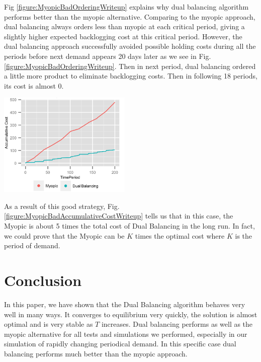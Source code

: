 \documentclass[twoside]{article}
\begin{document}
\begin{multicols}{2}
\begin{center}
  \end{center}
  Fig \ref{figure:MyopicBadOrderingWriteup} explains why dual balancing algorithm performs better than the myopic alternative. Comparing to the myopic approach, dual balancing always orders less than myopic at each critical period, giving a slightly higher expected backlogging cost at this critical period. However, the dual balancing approach successfully avoided possible holding costs during all the periods before next demand appears 20 days later as we see in Fig. \ref{figure:MyopicBadOrderingWriteup}. Then in next period, dual balancing ordered a little more product to eliminate backlogging costs. Then in following 18 periods, its cost is almost 0.
  \begin{center}
    \label{figure:MyopicBadAccumulativeCostWriteup}
    \includegraphics[width=2.5in]{figures/MyopicBadAccumulativeCostWriteup.png}
  \end{center}
  As a result of this good strategy, Fig. \ref{figure:MyopicBadAccumulativeCostWriteup} tells us that in this case, the Myopic is about 5 times the total cost of Dual Balancing in the long run. In fact, we could prove that the Myopic can be $K$ times the optimal cost where $K$ is the period of demand.

\section{Conclusion}

In this paper, we have shown that the Dual Balancing algorithm behaves very well in many ways. It converges to equilibrium very quickly, the solution is almost optimal and is very stable as $T$ increases. Dual balancing performs as well as the myopic alternative for all tests and simulations we performed, especially in our simulation of rapidly changing periodical demand. In this specific case dual balancing performs much better than the myopic approach.\\


\end{multicols}
\end{document}
